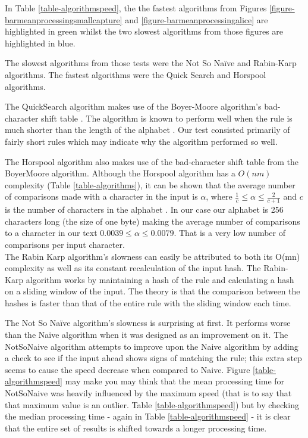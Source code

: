 \documentclass[9pt, conference]{IEEEtran}
\begin{document}
In Table \ref{table-algorithmspeed}, the the fastest algorithms from Figures \ref{figure-barmeanprocessingsmallcapture} and \ref{figure-barmeanprocessingalice} are highlighted in green whilst the two slowest algorithms from those figures are highlighted in blue.

The slowest algorithms from those tests were the Not So Na\"ive \citep{hancart1993} and Rabin-Karp \cite{karp1987} algorithms. The fastest algorithms were the Quick Search \citep{sunday1990} and Horspool \citep{horspool1980} algorithms.

The QuickSearch \citep{sunday1990} algorithm makes use of the Boyer-Moore \citep{boyer1977} algorithm's bad-character shift table \citep{charras2004}. The algorithm is known to perform well when the rule is much shorter than the length of the alphabet \citep{leqroc1995}. Our test consisted primarily of fairly short rules which may indicate why the algorithm performed so well.

The Horspool \citep{horspool1980} algorithm also makes use of the bad-character shift table from the BoyerMoore \citep{boyer1977} algorithm. Although the Horspool algorithm has a $O(nm)$ complexity (Table \ref{table-algorithms}), it can be shown that the average number of comparisons made with a character in the input is $\alpha$, where $\frac{1}{c} \leq \alpha \leq \frac{2}{c+1}$ and $c$ is the number of characters in the alphabet \citep{baezayates1992b}. In our case our alphabet is 256 characters long (the size of one byte) making the average number of comparisons to a character in our text $0.0039 \leq \alpha \leq 0.0079$. That is a very low number of comparisons per input character.\\

The Rabin Karp algorithm's \citep{karp1987} slowness can easily be attributed to both its O(mn) complexity as well as its constant recalculation of the input hash. The Rabin-Karp algorithm works by maintaining a hash of the rule and calculating a hash on a sliding window of the input. The theory is that the comparison between the hashes is faster than that of the entire rule with the sliding window each time.

The Not So Na\"ive algorithm's \citep{hancart1993} slowness is surprising at first. It performs worse than the Naive algorithm when it was designed as an improvement on it. The NotSoNaive algorithm attempts to improve upon the Naive algorithm by adding a check to see if the input ahead shows signs of matching the rule; this extra step seems to cause the speed decrease when compared to Naive. Figure \ref{table-algorithmspeed} may make you may think that the mean processing time for NotSoNaive was heavily influenced by the maximum speed (that is to say that that maximum value is an outlier. Table \ref{table-algorithmspeed}) but by checking the median processing time - again in Table \ref{table-algorithmspeed} - it is clear that the entire set of results is shifted towards a longer processing time.
\end{document}
